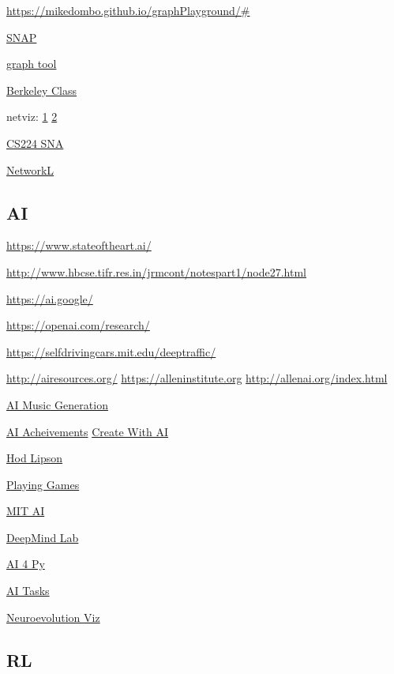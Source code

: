 \documentclass[]{book}
\begin{document}
\url{https://mikedombo.github.io/graphPlayground/\#}

\href{https://snap.stanford.edu/snappy/index.html}{SNAP}

\href{https://graph-tool.skewed.de/}{graph tool}

\href{http://blogs.ischool.berkeley.edu/i290-abdt-s12/}{Berkeley Class}

netviz: \href{http://curleylab.psych.columbia.edu/netviz/}{1} \textbar{}
\href{http://www.kateto.net/polnet2015}{2}

\href{https://web.stanford.edu/class/cs224w/handouts.html}{CS224 SNA}

\href{https://networkl.github.io/}{NetworkL}

\subsection{AI}\label{ai}

\url{https://www.stateoftheart.ai/}

\url{http://www.hbcse.tifr.res.in/jrmcont/notespart1/node27.html}

\url{https://ai.google/}

\url{https://openai.com/research/}

\url{https://selfdrivingcars.mit.edu/deeptraffic/}

\url{http://airesources.org/} \textbar{}
\url{https://alleninstitute.org} \textbar{}
\url{http://allenai.org/index.html}

\href{https://www.jukedeck.com}{AI Music Generation}

\href{https://poo.ai/}{AI Acheivements} \textbar{}
\href{http://createwith.ai/}{Create With AI}

\href{http://www.hodlipson.com/}{Hod Lipson}

\href{http://www.ggp.org/}{Playing Games}

\href{https://cbmm.mit.edu/}{MIT AI}

\href{https://deepmind.com/blog/open-sourcing-deepmind-lab/}{DeepMind
Lab}

\href{https://wiki.python.org/moin/PythonForArtificialIntelligence}{AI 4
Py}

\href{http://aiimpacts.org/concrete-ai-tasks-for-forecasting/}{AI Tasks}

\href{https://eng.uber.com/vine/}{Neuroevolution Viz}

\subsection{RL}\label{rl}
\end{document}
